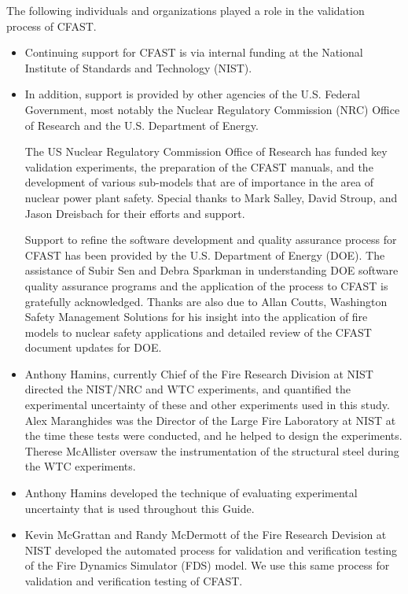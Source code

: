 \documentclass[12pt]{book}
\begin{document}
The following individuals and organizations played a role in the validation process of CFAST.
\begin{itemize}
\item Continuing support for CFAST is via internal funding at the National Institute of Standards and Technology (NIST). 

\item In addition, support is provided by other agencies of the U.S. Federal Government, most notably the Nuclear Regulatory Commission (NRC) Office of Research and the U.S. Department of Energy. 

The US Nuclear Regulatory Commission Office of Research has funded key validation experiments, the preparation of the CFAST manuals, and the development of various sub-models that are of importance in the area of nuclear power plant safety. Special thanks to Mark Salley, David Stroup, and Jason Dreisbach for their efforts and support.

Support to refine the software development and quality assurance process for CFAST has been provided by the U.S. Department of Energy (DOE). The assistance of Subir Sen and Debra Sparkman in understanding DOE software quality assurance programs and the application of the process to CFAST is gratefully acknowledged.  Thanks are also due to Allan Coutts, Washington Safety Management Solutions for his insight into the application of fire models to nuclear safety applications and detailed review of the CFAST document updates for DOE.

\item Anthony Hamins, currently Chief of the Fire Research Division at NIST directed the NIST/NRC and WTC experiments, and quantified the experimental uncertainty of these and other experiments used in this study. Alex Maranghides was the Director of the Large Fire Laboratory at NIST at the time these tests were conducted, and he helped to design the experiments. Therese McAllister oversaw the instrumentation of the structural steel during the WTC experiments.

\item Anthony Hamins developed the technique of evaluating experimental uncertainty that is used throughout this Guide. 

\item Kevin McGrattan and Randy McDermott of the Fire Research Devision at NIST developed the automated process for validation and verification testing of the Fire Dynamics Simulator (FDS) model.  We use this same process for validation and verification testing of CFAST.


\end{itemize}
\end{document}
